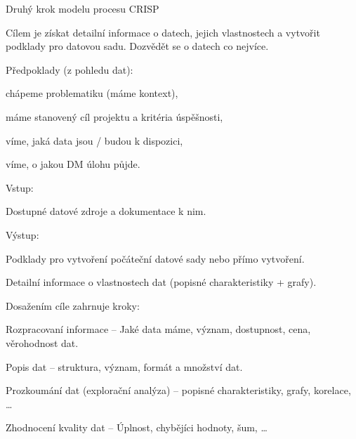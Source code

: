 \begin{compactitem}
    \item Druhý krok modelu procesu CRISP

    \item Cílem je získat detailní informace o datech, jejich vlastnostech a vytvořit podklady pro datovou sadu. Dozvědět se o datech co nejvíce.

    \item Předpoklady (z pohledu dat): \begin{compactitem}
        \item chápeme problematiku (máme kontext),
        \item máme stanovený cíl projektu a kritéria úspěšnosti,
        \item víme, jaká data jsou / budou k dispozici,
        \item víme, o jakou DM úlohu půjde.
    \end{compactitem}

    \item Vstup: \begin{compactitem}
        \item Dostupné datové zdroje a dokumentace k nim.
    \end{compactitem}

    \item Výstup: \begin{compactitem}
        \item Podklady pro vytvoření počáteční datové sady nebo přímo vytvoření.
        \item Detailní informace o vlastnostech dat (popisné charakteristiky + grafy).
    \end{compactitem}

    \item Dosažením cíle zahrnuje kroky: \begin{compactitem}
        \item Rozpracovaní informace -- Jaké data máme, význam, dostupnost, cena, věrohodnost dat.

        \item Popis dat -- struktura, význam, formát a množství dat.

        \item Prozkoumání dat (explorační analýza) -- popisné charakteristiky, grafy, korelace, \dots

        \item Zhodnocení kvality dat -- Úplnost, chybějíci hodnoty, šum, \dots
    \end{compactitem}
\end{compactitem}

